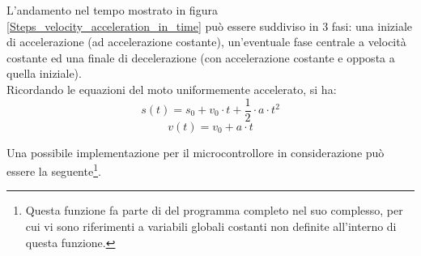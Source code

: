 \documentclass[12pt]{article}
\begin{document}
        
        L'andamento nel tempo mostrato in figura \ref{Steps_velocity_acceleration_in_time} può essere suddiviso in 3 fasi: una iniziale di accelerazione (ad accelerazione costante), un'eventuale fase centrale a velocità costante ed una finale di decelerazione (con accelerazione costante e opposta a quella iniziale).\\
        
        Ricordando le equazioni del moto uniformemente accelerato, si ha:
        \begin{equation}
            s(t) = s_0 + v_0 \cdot t + \frac{1}{2} \cdot a \cdot t^2
        \end{equation}
        \begin{equation}
            v(t) = v_0 + a \cdot t
        \end{equation}       
        

        \vspace{0.1cm}

        Una possibile implementazione per il microcontrollore in considerazione può essere la seguente\footnote{Questa funzione fa parte di del programma completo nel suo complesso, per cui vi sono riferimenti a variabili globali costanti non definite all'interno di questa funzione.}.
        
\end{document}

